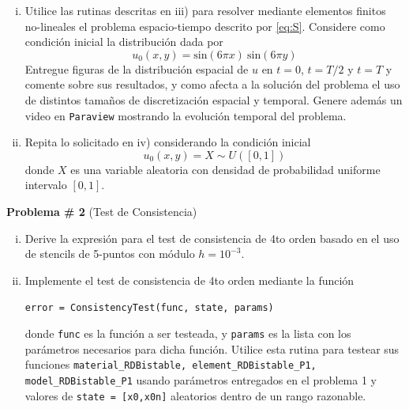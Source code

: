 \documentclass[11pt,letterpaper]{article}
\begin{document}
\begin{enumerate}[i)]
\item  Utilice las rutinas descritas en iii) para resolver mediante elementos finitos no-lineales el problema espacio-tiempo descrito por \eqref{eq:S}. Considere como condici\'on inicial la distribuci\'on dada por 
\begin{equation}
u_0(x,y) = \text{sin} (6 \pi x) \  \text{sin} (6 \pi y) 
\end{equation}
 Entregue figuras de la distribuci\'on espacial de $u$ en $t=0$, $t=T/2$ y $t=T$ y comente sobre sus resultados, y como afecta a la soluci\'on del problema el uso de distintos tama\~nos de discretizaci\'on espacial y temporal. Genere adem\'as un video en {\tt Paraview} mostrando la evoluci\'on temporal del problema.

\item Repita lo solicitado en iv) considerando la condici\'on inicial 	
	\begin{equation}
		u_0(x,y) = X \sim U([0,1])
	\end{equation}
donde $X$ es una variable aleatoria con densidad de probabilidad uniforme intervalo $[0,1]$.




\end{enumerate}	

{\bf Problema \# 2} (Test de Consistencia) 

\begin{enumerate}[i)]
	\item Derive la expresi\'on para el test de consistencia de 4to orden basado en el uso de stencils de 5-puntos con m\'odulo $h=10^{-3}$.
	\item Implemente el test de consistencia de 4to orden mediante la funci\'on
	\begin{center}
	{\tt error = ConsistencyTest(func, state, params)}
	\end{center}
donde {\tt func} es la funci\'on a ser testeada, y {\tt params} es la lista con los par\'ametros necesarios para dicha funci\'on. Utilice esta rutina para testear sus funciones {\tt material\_RDBistable, element\_RDBistable\_P1, model\_RDBistable\_P1} usando par\'ametros entregados en el problema 1 y valores de {\tt state = [x0,x0n]} aleatorios dentro de un rango razonable.
\end{enumerate}
\end{document}
